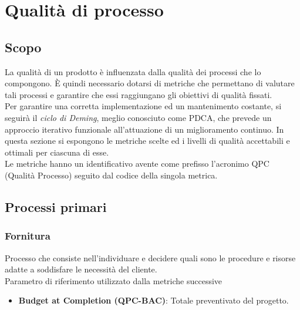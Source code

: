 \section{Qualità di processo}
\subsection{Scopo}
La qualità di un prodotto è influenzata dalla qualità dei processi che lo compongono.
È quindi necessario dotarsi di metriche che permettano di valutare tali processi e garantire che essi
raggiungano gli obiettivi di qualità fissati.\\
Per garantire una corretta implementazione ed un mantenimento costante, si seguirà
il \textit{ciclo di Deming}, meglio conosciuto come PDCA, che prevede un approccio iterativo funzionale
all'attuazione di un miglioramento continuo.
In questa sezione si espongono le metriche scelte ed i livelli di qualità accettabili e ottimali per ciascuna
di esse.\\
Le metriche hanno un identificativo avente come prefisso l'acronimo QPC (Qualità Processo) seguito dal codice della singola metrica.\\

\subsection{Processi primari}

\subsubsection{Fornitura}
Processo che consiste nell'individuare e decidere quali sono le procedure e risorse adatte a soddisfare le necessità del cliente.\\
Parametro di riferimento utilizzato dalla metriche successive\\
\begin{itemize}
    \item \textbf{Budget at Completion (QPC-BAC)}: Totale preventivato del progetto.
\end{itemize}

